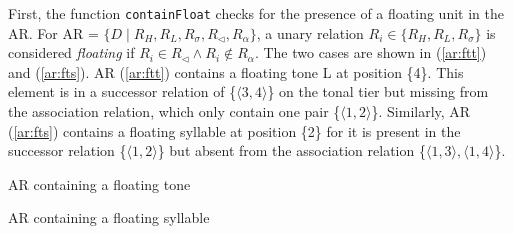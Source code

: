 \documentclass[11pt,letterpaper]{article}
\begin{document}
First, the function \texttt{containFloat} checks for the presence of a floating unit in the AR. For AR = $\{D\mid R_H, R_L, R_\sigma, R_\lhd, R_\alpha\}$, a unary relation \(R_i \in \{R_H, R_L, R_\sigma\}\) is considered \textit{floating} if \(R_i \in  R_\lhd \wedge R_i \notin R_\alpha\). The two cases are shown in (\ref{ar:ftt}) and (\ref{ar:fts}). AR (\ref{ar:ftt}) contains a floating tone L at position \{4\}. This element is in a successor relation of \{$\langle 3,4 \rangle$\}  on the tonal tier but missing from the association relation, which only contain one pair \{$\langle 1,2 \rangle$\}. Similarly, AR (\ref{ar:fts}) contains a floating syllable at position \{2\} for it is present in the successor relation \{$\langle 1,2 \rangle$\} but absent from the association relation \{$\langle 1,3 \rangle, \langle 1,4 \rangle$\}.

\begin{multicols}{2}
	\ea AR containing a floating tone \label{ar:ftt}
	
	\z
	\ea AR containing a floating syllable   \label{ar:fts}
	
	\z
\end{multicols}
\end{document}
